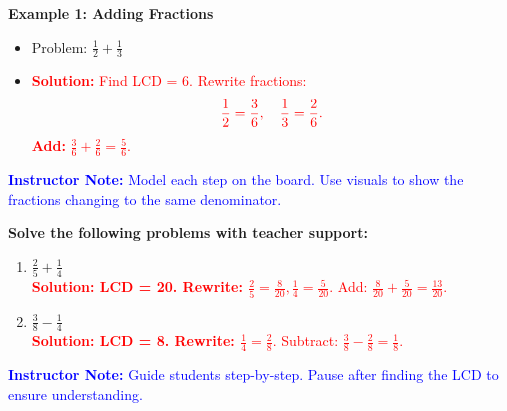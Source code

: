 \documentclass[12pt]{article}
\begin{document}
\begin{tcolorbox}[colframe=black!60, colback=white, 
coltitle=black, colbacktitle=black!15, fonttitle=\bfseries\Large, 
title=Examples, halign title=center, left=10pt, right=10pt, top=10pt, bottom=15pt]
\textbf{Example 1: Adding Fractions}
\begin{itemize}
    \item Problem: \( \frac{1}{2} + \frac{1}{3} \)
    \item \textcolor{red}{\textbf{Solution:} Find LCD = 6. Rewrite fractions:}
    \[
    \textcolor{red}{\frac{1}{2} = \frac{3}{6}, \quad \frac{1}{3} = \frac{2}{6}.}
    \]
    \textcolor{red}{\textbf{Add:} \( \frac{3}{6} + \frac{2}{6} = \frac{5}{6}. \)}
\end{itemize}

\textcolor{blue}{\textbf{Instructor Note:} Model each step on the board. Use visuals to show the fractions changing to the same denominator.}
\end{tcolorbox}

\vspace{1em}

\begin{tcolorbox}[colframe=black!60, colback=white, 
coltitle=black, colbacktitle=black!15, fonttitle=\bfseries\Large, 
title=Guided Practice, halign title=center, left=10pt, right=10pt, top=10pt, bottom=15pt]
\textbf{Solve the following problems with teacher support:}
\begin{enumerate}[itemsep=2em]
    \item \( \frac{2}{5} + \frac{1}{4} \) \\
    \textcolor{red}{\textbf{Solution: LCD = 20. Rewrite: \( \frac{2}{5} = \frac{8}{20}, \frac{1}{4} = \frac{5}{20}. \)} Add: \( \frac{8}{20} + \frac{5}{20} = \frac{13}{20}. \)}

    \item \( \frac{3}{8} - \frac{1}{4} \) \\
    \textcolor{red}{\textbf{Solution: LCD = 8. Rewrite: \( \frac{1}{4} = \frac{2}{8}. \)} Subtract: \( \frac{3}{8} - \frac{2}{8} = \frac{1}{8}. \)}
\end{enumerate}

\textcolor{blue}{\textbf{Instructor Note:} Guide students step-by-step. Pause after finding the LCD to ensure understanding.}
\end{tcolorbox}

\vspace{1em}
\end{document}
